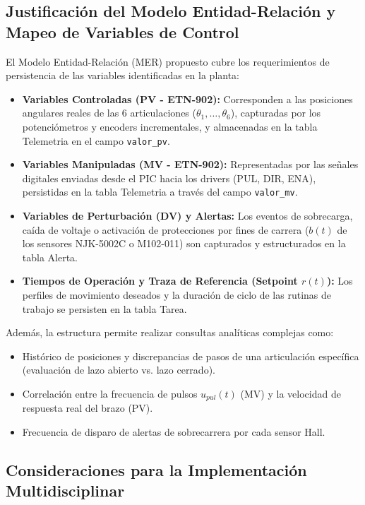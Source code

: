 \documentclass[11pt]{article}
\begin{document}
\subsection{Justificación del Modelo Entidad-Relación y Mapeo de Variables de Control}

El Modelo Entidad-Relación (MER) propuesto cubre los requerimientos de persistencia de las variables identificadas en la planta:

\begin{itemize}
	\item \textbf{Variables Controladas (PV - ETN-902):} Corresponden a las posiciones angulares reales de las 6 articulaciones ($\theta_1, \ldots, \theta_6$), capturadas por los potenciómetros y encoders incrementales, y almacenadas en la tabla Telemetria en el campo \texttt{valor\_pv}.
	\item \textbf{Variables Manipuladas (MV - ETN-902):} Representadas por las señales digitales enviadas desde el PIC hacia los drivers (PUL, DIR, ENA), persistidas en la tabla Telemetria a través del campo \texttt{valor\_mv}.
	\item \textbf{Variables de Perturbación (DV) y Alertas:} Los eventos de sobrecarga, caída de voltaje o activación de protecciones por fines de carrera ($b(t)$ de los sensores NJK-5002C o M102-011) son capturados y estructurados en la tabla Alerta.
	\item \textbf{Tiempos de Operación y Traza de Referencia (Setpoint $r(t)$):} Los perfiles de movimiento deseados y la duración de ciclo de las rutinas de trabajo se persisten en la tabla Tarea.
\end{itemize}

Además, la estructura permite realizar consultas analíticas complejas como:

\begin{itemize}
	\item Histórico de posiciones y discrepancias de pasos de una articulación específica (evaluación de lazo abierto vs. lazo cerrado).
	\item Correlación entre la frecuencia de pulsos $u_{pul}(t)$ (MV) y la velocidad de respuesta real del brazo (PV).
	\item Frecuencia de disparo de alertas de sobrecarrera por cada sensor Hall.
\end{itemize}

\subsection{Consideraciones para la Implementación Multidisciplinar}
\end{document}
